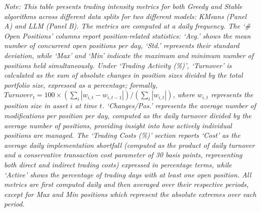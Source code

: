 \begin{table}[htbp]
\vspace{0.5cm}
\begin{minipage}{\textwidth}
\setlength{\parindent}{0pt}
\small\textit{Note: 
This table presents trading intensity metrics for both Greedy and Stable algorithms across different data splits for two different models: KMeans (Panel A) and LLM (Panel B). 
The metrics are computed at a daily frequency. The `\# Open Positions' columns report position-related statistics: 
`Avg.' shows the mean number of concurrent open positions per day, `Std.' represents their standard deviation, while 
`Max' and `Min' indicate the maximum and minimum number of positions held simultaneously. Under `Trading Activity (\%)', 
`Turnover' is calculated as the sum of absolute changes in position sizes divided by the total portfolio size, expressed 
as a percentage; formally, $Turnover_t = 100 \times (\sum_i |w_{i,t} - w_{i,t-1}|)/(\sum_i |w_{i,t}|)$, where $w_{i,t}$ 
represents the position size in asset $i$ at time $t$. `Changes/Pos.' represents the average number of modifications per 
position per day, computed as the daily turnover divided by the average number of positions, providing insight into how 
actively individual positions are managed. 
The `Trading Costs (\%)' section reports `Cost' as the average daily implementation shortfall (computed as the product of daily turnover and a conservative transaction cost parameter of 30 basis points, representing both direct and indirect trading costs) expressed in percentage terms, while `Active' shows the percentage of trading days with at least one open position.
%
All metrics are first computed daily and then averaged over their respective periods, except for Max and Min positions which represent the absolute extremes over each period.
}
\end{minipage}
\end{table}